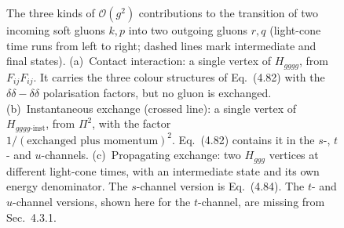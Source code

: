 {\begin{figure}[h!]
\caption{The three kinds of $\mathcal O(g^2)$ contributions to the transition of two incoming soft gluons $k,p$ into two outgoing gluons $r,q$ (light-cone time runs from left to right; dashed lines mark intermediate and final states). (a)~Contact interaction: a single vertex of $H_{gggg}$, from $F_{ij}F_{ij}$. It carries the three colour structures of Eq.~(4.82) with the $\delta\delta-\delta\delta$ polarisation factors, but no gluon is exchanged. (b)~Instantaneous exchange (crossed line): a single vertex of $H_{gggg\text{-inst}}$, from $\Pi^2$, with the factor $1/(\text{exchanged plus momentum})^2$. Eq.~(4.82) contains it in the $s$-, $t$- and $u$-channels. (c)~Propagating exchange: two $H_{ggg}$ vertices at different light-cone times, with an intermediate state and its own energy denominator. The $s$-channel version is Eq.~(4.84). The $t$- and $u$-channel versions, shown here for the $t$-channel, are missing from Sec.~4.3.1.}
\label{fig:threekinds}
\end{figure}}
